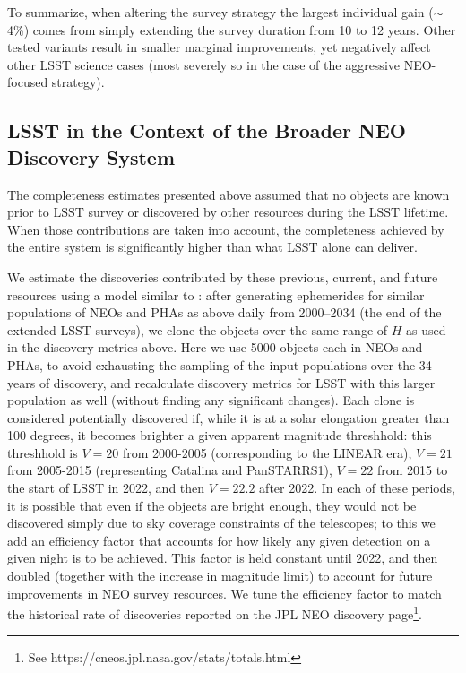 To summarize, when altering the survey strategy the largest individual gain ($\sim$4\%) comes from simply extending the survey duration from 10 to 12 years. Other tested variants result in smaller marginal improvements, yet negatively affect other LSST science cases (most severely so in the case of the aggressive NEO-focused strategy).

\subsection{LSST in the Context of the Broader NEO Discovery System\label{sec:known}}

The completeness estimates presented above assumed that no objects are known prior to LSST survey or 
discovered by other resources during the LSST lifetime. When those contributions are taken into account, the completeness achieved by the entire system is significantly higher than what LSST alone can deliver.


We estimate the discoveries contributed by these previous, current, and future resources 
using a model similar to \citet{VeresChesley2017neo}: 
after generating ephemerides for similar populations of NEOs and PHAs as above daily from 2000--2034 
(the end of the extended LSST surveys), we clone the objects over the same range of $H$ as 
used in the discovery metrics above. Here we use 5000 objects each in NEOs and PHAs, to avoid
exhausting the sampling of the input populations over the 34 years of discovery, and recalculate 
discovery metrics for LSST with this larger population as well (without finding any significant changes). 
Each clone is considered potentially discovered if, while it is at
a solar elongation greater than 100 degrees, it becomes brighter a given apparent magnitude threshhold: 
this threshhold is $V=20$ from 2000-2005 (corresponding to the LINEAR era), $V=21$ from 2005-2015 
(representing Catalina and PanSTARRS1), $V=22$ from 2015 to the start of LSST in 2022, and then
$V=22.2$ after 2022.  In each of these periods, it is possible that even if the objects are bright enough, 
they would not be discovered simply due to sky coverage constraints of the telescopes; to 
this we add an efficiency factor that accounts for how likely any given detection on a given night is to be achieved. 
This factor is held constant until 2022, and then doubled (together with the increase in magnitude 
limit) to account for future improvements in NEO survey resources. We tune the efficiency factor to match
the historical rate of discoveries reported on the JPL NEO discovery page\footnote{See https://cneos.jpl.nasa.gov/stats/totals.html}.


